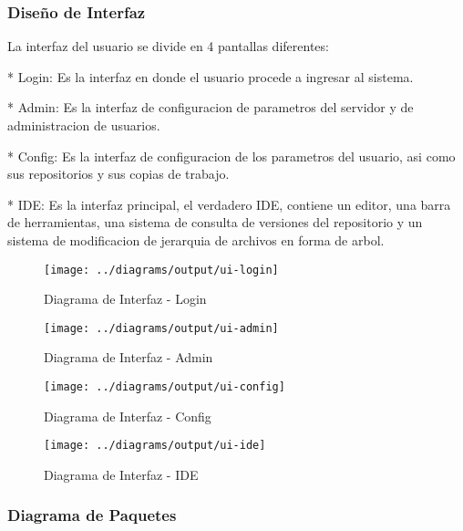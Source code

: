 \subsubsection{Diseño de Interfaz}

La interfaz del usuario se divide en 4 pantallas diferentes:

* Login: Es la interfaz en donde el usuario procede a ingresar al sistema.

* Admin: Es la interfaz de configuracion de parametros del servidor y de administracion de usuarios.

* Config: Es la interfaz de configuracion de los parametros del usuario, asi como sus repositorios y sus copias de trabajo.

* IDE: Es la interfaz principal, el verdadero IDE, contiene un editor, una barra de herramientas, una sistema de consulta de versiones del repositorio y un sistema de modificacion de jerarquia de archivos en forma de arbol.

\begin{landscape}
\begin{figure}
 \centering
 \texttt{[image: ../diagrams/output/ui-login]}
 \caption{Diagrama de Interfaz - Login}
 \label{diagrama:ui-login}
\end{figure}
\end{landscape}

\begin{figure}
 \centering
 \texttt{[image: ../diagrams/output/ui-admin]}
 \caption{Diagrama de Interfaz - Admin}
 \label{diagrama:ui-admin}
\end{figure}

\begin{figure}
 \centering
 \texttt{[image: ../diagrams/output/ui-config]}
 \caption{Diagrama de Interfaz - Config}
 \label{diagrama:ui-config}
\end{figure}

\begin{landscape}
\begin{figure}
 \centering
 \texttt{[image: ../diagrams/output/ui-ide]}
 \caption{Diagrama de Interfaz - IDE}
 \label{diagrama:ui-ide}
\end{figure}
\end{landscape}


\subsubsection{Diagrama de Paquetes}

